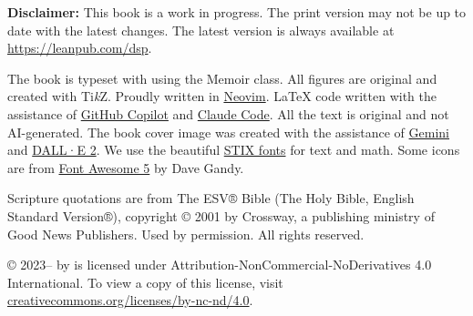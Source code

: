 \documentclass[print,gray]{dspbook}
\begin{document}
\vfill

{
  \footnotesize\noindent
  \textbf{Disclaimer:} This book is a work in progress.  The print version may not be up
  to date with the latest changes.  The latest version is always available at
  \url{https://leanpub.com/dsp}.
}

\vspace{0.5cm}
{
\footnotesize\noindent
The book is typeset with \XeTeX{} using the Memoir class.  All figures are
original and created with Ti\textit{k}Z.  Proudly written in
\href{https://neovim.io/}{Neovim}.  \LaTeX{} code written with the assistance of
\href{https://github.com/features/copilot}{GitHub Copilot} and
\href{https://www.anthropic.com/claude-code}{Claude Code}.
All the text is original and not AI-generated.
The book cover image was created with the assistance of
\href{https://gemini.google.com}{Gemini} and \href{https://openai.com/dall-e-2}{DALL·E 2}.
We use the beautiful \href{https://www.stixfonts.org/}{STIX fonts} for text and math.
Some icons are from \href{https://fontawesome.com/}{Font Awesome 5} by Dave Gandy.
}

\vspace{0.5cm}
{
\footnotesize\noindent
Scripture quotations are from The ESV® Bible (The Holy Bible, English Standard Version®),
copyright © 2001 by Crossway, a publishing ministry of Good News Publishers. Used by
permission. All rights reserved.
}

\vspace{0.5cm}
{
\footnotesize\noindent
\thetitle{} © 2023--\the\year{} by \theauthor{} is licensed under
Attribution-NonCommercial-NoDerivatives 4.0 International. To view a copy of this license,
visit
\href{http://creativecommons.org/licenses/by-nc-nd/4.0/}{creativecommons.org/licenses/by-nc-nd/4.0}.
}

\cleardoublepage



\cleardoublepage



\cleardoublepage

\tableofcontents

\cleardoublepage

\mainmatter










\backmatter

\startappendices




\printglossary

\printbibliography[heading=bibintoc]
\end{document}
